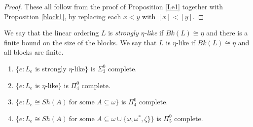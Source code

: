 \documentclass[11pt]{amsart}
\theoremstyle{definition}
\begin{document}
\begin{proof} These all follow from the proof of Proposition \ref{Le1} together with Proposition \ref{block1}, by replacing each $x<y$ with $[x] < [y]$. 
\end{proof}

We say that the linear ordering $L$ is \emph{strongly $\eta$-like} if $Bk(L) \cong \eta$ and there is a finite bound on the size of the blocks. We say that $L$ is $\eta$-like if $Bk(L) \cong \eta$ and all blocks are finite. 


\begin{theorem} \label{shornot} \begin{enumerate} 

    \item $\{e: L_e$ is strongly $\eta$-like$\}$ is $\Sigma^0_3$ complete. 
    \item $\{e: L_e$ is $\eta$-like$\}$ is $\Pi^0_4$ complete. 

        \item $\{e: L_e \cong Sh(A) \ \text{for some $A \subseteq \omega$}\}$ is $\Pi^0_4$ complete.

    \item $\{e: L_e \cong Sh(A) \ \text{for some $A \subseteq \omega\cup \{\omega, \omega^*,\zeta\}$}\}$ is $\Pi^0_5$ complete.

\end{enumerate}
\end{theorem}
\end{document}
